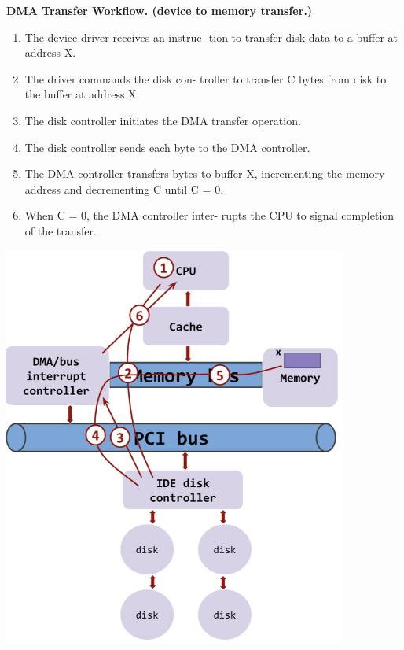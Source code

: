 \documentclass[8pt]{extarticle}
\begin{document}
\begin{minipage}[t]{0.5\textwidth}
\begin{minipage}[htp]{0.48\textwidth}
\noindent\textbf{DMA Transfer Workflow. (device to memory transfer.)}
\begin{enumerate}[noitemsep,topsep=0pt]
\item The device driver receives an instruc-
    tion to transfer disk data to a buffer at
    address X.
\item The driver commands the disk con-
    troller to transfer C bytes from disk to
    the buffer at address X.
\item The disk controller initiates the DMA
    transfer operation.
\item The disk controller sends each byte to
    the DMA controller.
\item The DMA controller transfers bytes
    to buffer X, incrementing the memory
    address and decrementing C until C =
    0.
\item When C = 0, the DMA controller inter-
    rupts the CPU to signal completion of
    the transfer.
\end{enumerate}
\end{minipage}
\hfill
\begin{minipage}[htp]{0.48\textwidth}
\begin{center}
\includegraphics[width=0.85\textwidth]{images/dma.png}
\end{center}
\end{minipage}
\end{minipage}
\end{document}
